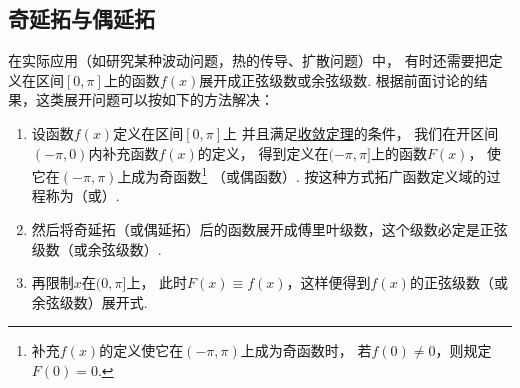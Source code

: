 \subsection{奇延拓与偶延拓}
在实际应用（如研究某种波动问题，热的传导、扩散问题）中，%
有时还需要把定义在区间\([0,\pi]\)上的函数\(f(x)\)展开成正弦级数或余弦级数.
根据前面讨论的结果，这类展开问题可以按如下的方法解决：
\begin{enumerate}
\item 设函数\(f(x)\)定义在区间\([0,\pi]\)上%
并且满足\hyperref[theorem:无穷级数.傅里叶级数收敛的狄利克雷充分条件]{收敛定理}的条件，%
我们在开区间\((-\pi,0)\)内补充函数\(f(x)\)的定义，%
得到定义在\((-\pi,\pi]\)上的函数\(F(x)\)，%
使它在\((-\pi,\pi)\)上成为奇函数\footnote{%
补充\(f(x)\)的定义使它在\((-\pi,\pi)\)上成为奇函数时，%
若\(f(0)\neq0\)，则规定\(F(0)=0\).}%
（或偶函数）.
按这种方式拓广函数定义域的过程称为（或）.

\item 然后将奇延拓（或偶延拓）后的函数展开成傅里叶级数，这个级数必定是正弦级数（或余弦级数）.

\item 再限制\(x\)在\((0,\pi]\)上，%
此时\(F(x)\equiv f(x)\)，这样便得到\(f(x)\)的正弦级数（或余弦级数）展开式.
\end{enumerate}

